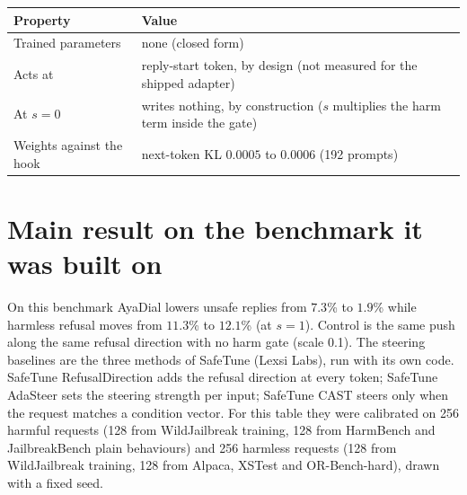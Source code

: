 \documentclass[10pt,a4paper]{article}
\begin{document}
\noindent\begin{minipage}[b]{0.47\linewidth}\centering\footnotesize\begin{tabularx}{\linewidth}{|l|>{\raggedright\arraybackslash}X|}\hline Property & Value\\\hline
Trained parameters & none (closed form)\\
\hline
Acts at & reply-start token, by design (not measured for the shipped adapter)\\
\hline
At $s = 0$ & writes nothing, by construction ($s$ multiplies the harm term inside the gate)\\
\hline
Weights against the hook & next-token KL $0.0005$ to $0.0006$ (192 prompts)\\
\hline\end{tabularx}\end{minipage}\hfill
\begin{minipage}[b]{0.5\linewidth}\centering{}
\end{minipage}
\section{Main result on the benchmark it was built on}\label{sec:main}
On this benchmark AyaDial lowers unsafe replies from $7.3$\% to $1.9$\% while harmless refusal moves from $11.3$\% to $12.1$\% (at $s = 1$). Control is the same push along the same refusal direction with no harm gate (scale 0.1). The steering baselines are the three methods of SafeTune (Lexsi Labs), run with its own code. SafeTune RefusalDirection adds the refusal direction at every token; SafeTune AdaSteer sets the steering strength per input; SafeTune CAST steers only when the request matches a condition vector. For this table they were calibrated on 256 harmful requests (128 from WildJailbreak training, 128 from HarmBench and JailbreakBench plain behaviours) and 256 harmless requests (128 from WildJailbreak training, 128 from Alpaca, XSTest and OR-Bench-hard), drawn with a fixed seed.
\end{document}
